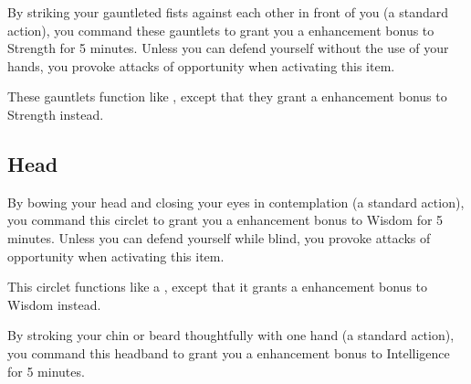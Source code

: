  By striking your gauntleted fists against each other in front of you (a standard action), you command these gauntlets to grant you a  enhancement bonus to Strength for 5 minutes. Unless you can defend yourself without the use of your hands, you provoke attacks of opportunity when activating this item.


 These gauntlets function like , except that they grant a  enhancement bonus to Strength instead.


\subsection{Head}

 By bowing your head and closing your eyes in contemplation (a standard action), you command this circlet to grant you a  enhancement bonus to Wisdom for 5 minutes. Unless you can defend yourself while blind, you provoke attacks of opportunity when activating this item.


 This circlet functions like a , except that it grants a  enhancement bonus to Wisdom instead.


 By stroking your chin or beard thoughtfully with one hand (a standard action), you command this headband to grant you a  enhancement bonus to Intelligence for 5 minutes.


